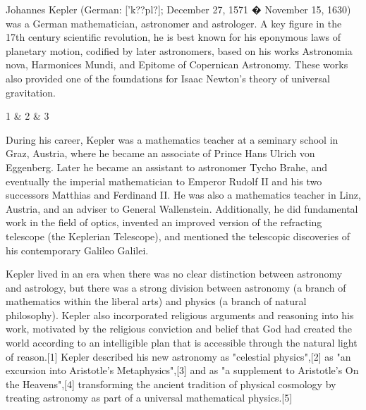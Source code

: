 Johannes Kepler (German: ['k??pl?]; December 27, 1571 � November 15, 1630) was a German mathematician, astronomer and astrologer. A key figure in the 17th century scientific revolution, he is best known for his eponymous laws of planetary motion, codified by later astronomers, based on his works Astronomia nova, Harmonices Mundi, and Epitome of Copernican Astronomy. These works also provided one of the foundations for Isaac Newton's theory of universal gravitation.

\begin{tabular}
1 & 2 & 3 \\
\end{tabular}

During his career, Kepler was a mathematics teacher at a seminary school in Graz, Austria, where he became an associate of Prince Hans Ulrich von Eggenberg. Later he became an assistant to astronomer Tycho Brahe, and eventually the imperial mathematician to Emperor Rudolf II and his two successors Matthias and Ferdinand II. He was also a mathematics teacher in Linz, Austria, and an adviser to General Wallenstein. Additionally, he did fundamental work in the field of optics, invented an improved version of the refracting telescope (the Keplerian Telescope), and mentioned the telescopic discoveries of his contemporary Galileo Galilei.

\begin{centering}
Kepler lived in an era when there was no clear distinction between astronomy and astrology, but there was a strong division between astronomy (a branch of mathematics within the liberal arts) and physics (a branch of natural philosophy). Kepler also incorporated religious arguments and reasoning into his work, motivated by the religious conviction and belief that God had created the world according to an intelligible plan that is accessible through the natural light of reason.[1] Kepler described his new astronomy as "celestial physics",[2] as "an excursion into Aristotle's Metaphysics",[3] and as "a supplement to Aristotle's On the Heavens",[4] transforming the ancient tradition of physical cosmology by treating astronomy as part of a universal mathematical physics.[5]
\end{centering}


